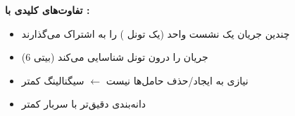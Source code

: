 \textbf{تفاوت‌های کلیدی با :}

\begin{itemize}
\tightlist
\item
  چندین جریان  یک نشست  واحد (یک تونل ) را به اشتراک می‌گذارند
\item
   (6 بیتی) جریان را درون تونل شناسایی می‌کند
\item
  نیازی به ایجاد/\allowbreak{}حذف حامل‌ها نیست \ensuremath{\leftarrow} سیگنالینگ کمتر
\item
  دانه‌بندی دقیق‌تر با سربار کمتر
\end{itemize}



